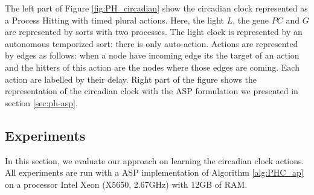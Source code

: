 The left part of Figure \ref{fig:PH_circadian} show the circadian clock represented as a Process Hitting with timed plural actions.
Here, the light $L$, the gene $PC$ and $G$ are represented by sorts with two processes.
The light clock is represented by an autonomous temporized sort: there is only auto-action.
Actions are represented by edges as follows: when a node have incoming edge its the target of an action and the hitters of this action are the nodes where those edges are coming.
Each action are labelled by their delay.
Right part of the figure shows the representation of the circadian clock with the ASP formulation we presented in section \ref{sec:ph-asp}.

\subsection{Experiments}

In this section, we evaluate our approach on learning the circadian clock actions.
All experiments are run with a ASP implementation of Algorithm \ref{alg:PHC_ap} on a processor Intel Xeon (X5650, 2.67GHz) with 12GB of RAM.

